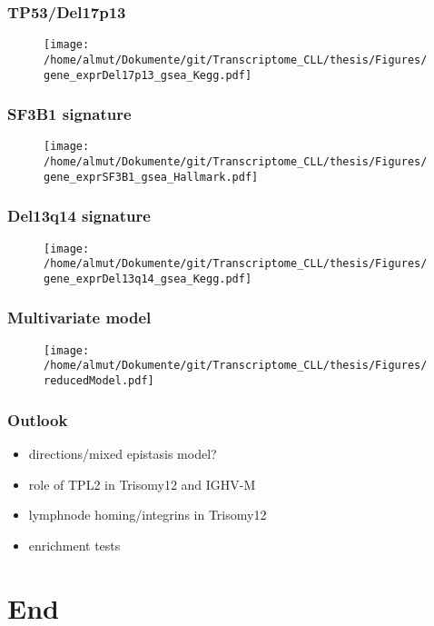\documentclass[xcolor=dvipsnames,t,10pt]{beamer}
\begin{document}
%
%
\begin{frame}[c]
	\frametitle{TP53/Del17p13}
	\begin{figure}
		\centering
		\texttt{[image: /home/almut/Dokumente/git/Transcriptome\_CLL/thesis/Figures/gene\_exprDel17p13\_gsea\_Kegg.pdf]}
	\end{figure}
\end{frame}
%
%
\begin{frame}[c]
	\frametitle{SF3B1 signature}
	\begin{figure}
		\centering
		\texttt{[image: /home/almut/Dokumente/git/Transcriptome\_CLL/thesis/Figures/gene\_exprSF3B1\_gsea\_Hallmark.pdf]}
	\end{figure}
\end{frame}
%
%
\begin{frame}[c]
	\frametitle{Del13q14 signature}
	\begin{figure}
		\centering
		\texttt{[image: /home/almut/Dokumente/git/Transcriptome\_CLL/thesis/Figures/gene\_exprDel13q14\_gsea\_Kegg.pdf]}
	\end{figure}
\end{frame}
%
%
%
\begin{frame}[c]
	\frametitle{Multivariate model}
	\begin{figure}
		\centering
		\texttt{[image: /home/almut/Dokumente/git/Transcriptome\_CLL/thesis/Figures/reducedModel.pdf]}
	\end{figure}
\end{frame}
% 
%
\begin{frame}[c]
	\frametitle{Outlook}
	\begin{itemize}
		\item directions/mixed epistasis model?
		\item role of TPL2 in Trisomy12 and IGHV-M
		\item lymphnode homing/integrins in Trisomy12
		\item enrichment tests 
	\end{itemize}
\end{frame}

\section{End}
\end{document}
